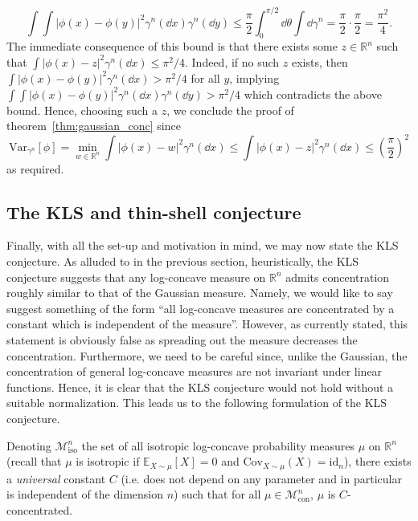 \[\int \int |\phi(x) - \phi(y)|^2 \gamma^n(\dd x) \gamma^n(\dd y) 
  \le \frac{\pi}{2}\int_0^{\pi / 2} \dd \theta \int \dd \gamma^n
  = \frac{\pi}{2} \cdot \frac{\pi}{2} = \frac{\pi^2}{4}.\]
The immediate consequence of this bound is that there exists some \(z \in \mathbb{R}^n\) such that 
\(\int |\phi(x) - z|^2 \gamma^n(\dd x) \le \pi^2 / 4\). Indeed, if no such \(z\) exists, 
then \(\int |\phi(x) - \phi(y)|^2 \gamma^n(\dd x) > \pi^2 / 4\) for all \(y\), implying
\(\int \int |\phi(x) - \phi(y)|^2 \gamma^n(\dd x) \gamma^n(\dd y) > \pi^2 / 4\) which 
contradicts the above bound. Hence, choosing such a \(z\), we conclude the proof of 
theorem~\ref{thm:gaussian_conc} since
\[\text{Var}_{\gamma^n}[\phi] = \min_{w \in \mathbb{R}^n} \int |\phi(x) - w|^2 \gamma^n(\dd x)
  \le \int |\phi(x) - z|^2 \gamma^n(\dd x) \le \left(\frac{\pi}{2}\right)^2\]
as required.

\subsection{The KLS and thin-shell conjecture}

Finally, with all the set-up and motivation in mind, we may now state the KLS conjecture.
As alluded to in the previous section, heuristically, the KLS conjecture suggests that any log-concave measure on 
\(\mathbb{R}^n\) admits concentration roughly similar to that of the Gaussian measure. Namely, we would like 
to say suggest something of the form ``all log-concave measures are concentrated by a constant which is 
independent of the measure''. However, as currently stated, this statement is obviously false as spreading out 
the measure decreases the concentration. Furthermore, we need to be careful since, unlike the Gaussian, the 
concentration of general log-concave measures are not invariant under linear functions. Hence, it is clear that the KLS 
conjecture would not hold without a suitable normalization. This leads us to the following formulation 
of the KLS conjecture.

\begin{conjecture}\label{conj:KLS}
  Denoting \(\mathscr{M}^n_{\text{iso}}\) the set of all isotropic log-concave probability measures \(\mu\) on 
  \(\mathbb{R}^n\) (recall that \(\mu\) is isotropic if \(\mathbb{E}_{X \sim \mu}[X] = 0\) and \(\text{Cov}_{X \sim \mu}(X) = \text{id}_n\)),
  there exists a \textit{universal} constant \(C\) 
  (i.e. does not depend on any parameter and in particular is independent of the dimension \(n\)) such that for all 
  \(\mu \in \mathscr{M}^n_{\text{con}}\), \(\mu\) is \(C\)-concentrated.
\end{conjecture}

